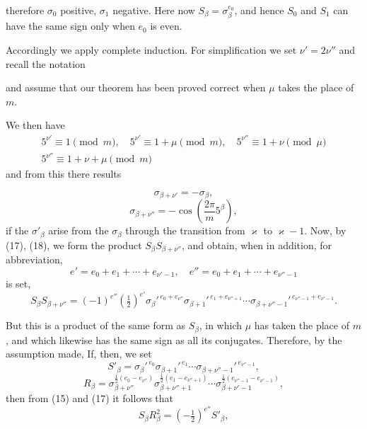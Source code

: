 
therefore $\sigma_0$ positive, $\sigma_1$ negative. Here now $S_\beta = \sigma_\beta^{e_0}$,
and hence $S_0$ and $S_1$ can have the same sign only when $e_0$
is even.

Accordingly we apply complete induction. For simplification
we set $\nu' = 2\nu''$ and recall the notation

and assume that our theorem has been proved correct when
$\mu$ takes the place of $m$.

We then have
\[
\begin{gathered}
5^{\nu'} \equiv 1 \pmod{m}, \quad 5^{\nu'} \equiv 1+\mu \pmod{m}, \quad 5^{\nu''} \equiv 1+\nu \pmod{\mu} \\
5^{\nu''} \equiv 1+\nu+\mu \pmod{m}
\end{gathered}
\]
and from this there results

\[
\sigma_{\beta+\nu'} = -\sigma_\beta,
\]
\[
\sigma_{\beta+\nu''} = -\cos\left(\frac{2\pi}{m}5^\beta\right),
\]
if the $\sigma'_\beta$ arise from the $\sigma_\beta$ through the transition from $\varkappa$ to
$\varkappa - 1$. Now, by (17), (18), we form the product
$S_\beta S_{\beta+\nu''}$, and obtain, when in addition, for abbreviation,
\[
e' = e_0 + e_1 + \cdots + e_{\nu'-1}, \quad e'' = e_0 + e_1 + \cdots + e_{\nu''-1}
\]
is set,
\[
S_\beta S_{\beta+\nu''} = (-1)^{e''}\left(\tfrac{1}{2}\right)^{e'}\sigma_\beta'^{\,e_0+e_{\nu''}}\sigma_{\beta+1}'^{\,e_1+e_{\nu''+1}}\cdots\sigma_{\beta+\nu''-1}'^{\,e_{\nu''-1}+e_{\nu'-1}}.
\]

But this is a product of the same form as $S_\beta$, in
which $\mu$ has taken the place of $m$, and which likewise has
the same sign as all its conjugates. Therefore, by
the assumption made,
If, then, we set
\[
S'_\beta = \sigma_\beta'^{\,e_0}\sigma_{\beta+1}'^{\,e_1}\cdots\sigma_{\beta+\nu''-1}'^{\,e_{\nu''-1}},
\]
\[
R_\beta = \sigma_{\beta+\nu''}^{\frac{1}{2}(e_0-e_{\nu''})}\sigma_{\beta+\nu''+1}^{\frac{1}{2}(e_1-e_{\nu''+1})}\cdots\sigma_{\beta+\nu'-1}^{\frac{1}{2}(e_{\nu''-1}-e_{\nu'-1})},
\]
then from (15) and (17) it follows that
\[
S_\beta R_\beta^2 = \left(-\tfrac{1}{2}\right)^{e''}S'_\beta,
\]
